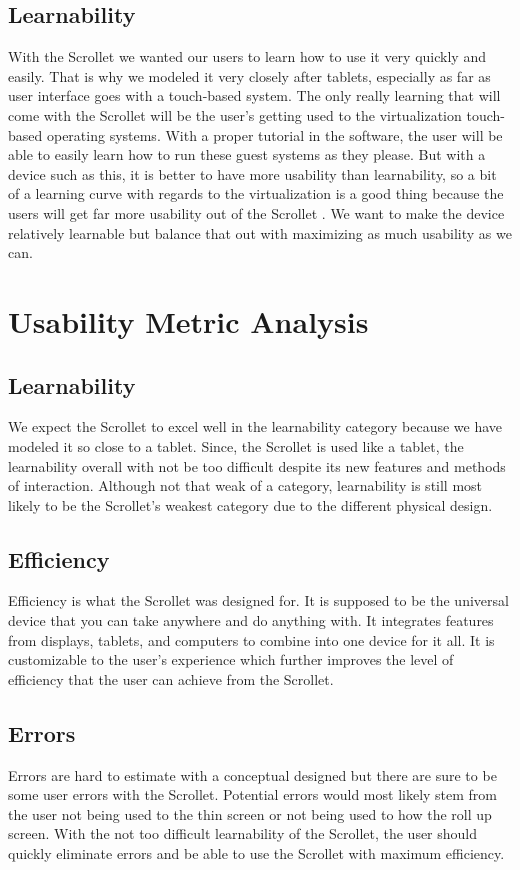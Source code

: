 \documentclass[a4paper]{article}
\begin{document}
\subsection{Learnability}
With the Scrollet we wanted our users to learn how to use it very quickly and easily. That is why we modeled it very closely after tablets, especially as far as user interface goes with a touch-based system. The only really learning that will come with the Scrollet will be the user's getting used to the virtualization touch-based operating systems. With a proper tutorial in the software, the user will be able to easily learn how to run these guest systems as they please. But with a device such as this, it is better to have more usability than learnability, so a bit of a learning curve with regards to the virtualization is a good thing because the users will get far more usability out of the Scrollet \cite{Tog}. We want to make the device relatively learnable but balance that out with maximizing as much usability as we can.


\section{Usability Metric Analysis}
\subsection{Learnability}
We expect the Scrollet to excel well in the learnability category because we have modeled it so close to a tablet. Since, the Scrollet is used like a tablet, the learnability overall with not be too difficult despite its new features and methods of interaction. Although not that weak of a category, learnability is still most likely to be the Scrollet's weakest category due to the different physical design.
\subsection{Efficiency}
Efficiency is what the Scrollet was designed for. It is supposed to be the universal device that you can take anywhere and do anything with. It integrates features from displays, tablets, and computers to combine into one device for it all. It is customizable to the user's experience which further improves the level of efficiency that the user can achieve from the Scrollet.
\subsection{Errors}
Errors are hard to estimate with a conceptual designed but there are sure to be some user errors with the Scrollet. Potential errors would most likely stem from the user not being used to the thin screen or not being used to how the roll up screen. With the not too difficult learnability of the Scrollet, the user should quickly eliminate errors and be able to use the Scrollet with maximum efficiency.
\end{document}
